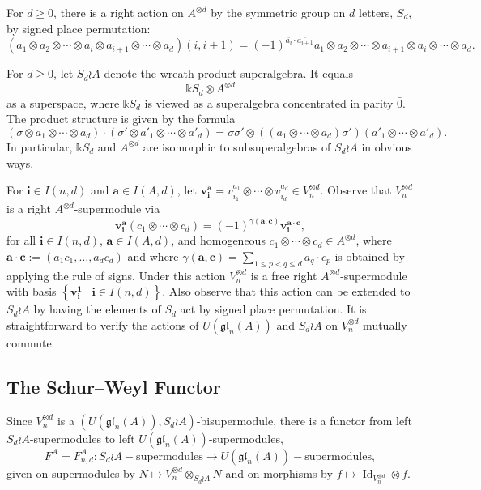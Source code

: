 \documentclass[11pt,reqno]{amsart} %
\newcommand{\gl}{\mathfrak{gl}}
\renewcommand{\k}{\mathds{k}}
\newcommand{\0}{\bar{0}}
\newcommand{\1}{\bar{1}}
\newcommand{\parity}[1]{\overline{#1}}
\newcommand{\Id}{\operatorname{Id}}
\newcommand{\wreath}{\wr}
\newcommand{\bv}{\mathbf{v}}
\newcommand{\SdwreathA}{S_{d} \wreath A}
\newcommand{\bi}{\mathbf{i}}
\newcommand{\ba}{\mathbf{a}}
\newcommand{\bc}{\mathbf{c}}
\newcommand{\bone}{\mathbf{1}}
\numberwithin{equation}{subsection}
\begin{document}
For $d \geq 0$, there is a right action on $A^{\otimes d}$ by the symmetric group on $d$ letters, $S_{d}$, by signed place permutation:
\[
(a_{1} \otimes a_{2} \otimes \dotsb \otimes a_{i} \otimes a_{i+1} \otimes \dotsb \otimes a_{d}) (i,i+1) = (-1)^{\parity{a_{i}}\cdot\parity{a_{i+1}}} a_{1} \otimes a_{2} \otimes \dotsb \otimes a_{i+1} \otimes a_{i} \otimes \dotsb \otimes a_{d}.
\]  


For $d \geq 0$, let $S_{d} \wreath A$ denote the wreath product superalgebra.  It equals 
\[
\k S_{d} \otimes  A^{\otimes d} 
\] as a superspace, where $\k S_{d}$ is viewed as a superalgebra concentrated in parity $\0$.  The product structure is given by the formula 
\[
\left( \sigma \otimes a_{1} \otimes \dotsb \otimes  a_{d} \right)  \cdot \left(\sigma' \otimes a'_{1} \otimes \dotsb \otimes  a'_{d} \right) =  \sigma\sigma' \otimes \left((a_{1} \otimes \dotsb \otimes  a_{d})\sigma' \right) \left(a'_{1} \otimes \dotsb \otimes a'_{d} \right).
\]  In particular, $\k S_{d}$ and $A^{\otimes d}$ are isomorphic to subsuperalgebras of $\SdwreathA$ in obvious ways.




For $\bi \in I(n,d)$ and $\ba \in I(A,d)$, let $\bv_{\bi}^{\ba} = v_{i_{1}}^{a_{1}} \otimes \dotsb \otimes v_{i_{d}}^{a_{d}} \in V_{n}^{\otimes d}$.  Observe that  $V_{n}^{\otimes d}$ is a right $A^{\otimes d}$-supermodule via 
\[
\bv_{\bi}^{\ba} \left( c_{1}\otimes \dotsb \otimes c_{d}\right) = (-1)^{\gamma(\ba, \bc)}\bv_{\bi}^{\ba \cdot \bc},
\] for all $\bi \in I(n,d)$, $\ba \in I(A,d)$, and homogeneous $c_{1} \otimes \dotsb \otimes  c_{d} \in A^{\otimes d}$, where $\ba \cdot \bc := (a_{1}c_{1}, \dotsc , a_{d}c_{d})$ and where $\gamma(\ba, \bc) = \sum_{1 \leq p < q \leq d} \parity{a_{q}}\cdot\parity{c_{p}}$ is obtained by applying the rule of signs.  Under this action $V_{n}^{\otimes d}$ is a free right $A^{\otimes d}$-supermodule with basis $\left\{\bv^{\bone}_{\bi} \mid \bi \in I(n,d) \right\}$.  Also observe that this action can be extended to $S_{d} \wreath A$ by having the elements of $S_{d}$ act by signed place permutation.  It is straightforward to verify the actions of $U(\gl_{n}(A))$ and $\SdwreathA$ on $V_{n}^{\otimes d}$ mutually commute.



\subsection{The Schur--Weyl  Functor}   Since $V_{n}^{\otimes  d}$ is a $(U(\gl_{n}(A)), S_{d}\wreath A)$-bisupermodule,  there is a functor from left $S_{d}\wreath A$-supermodules to left $U(\gl_{n}(A))$-supermodules,
\[
F^{A}=F_{n,d}^{A}: S_{d} \wreath A-\text{supermodules} \to U(\gl_{n}(A))-\text{supermodules},
\] given on supermodules by $N \mapsto V_{n}^{\otimes d} \otimes_{S_{d}\wreath A} N$ and on morphisms by $f \mapsto \Id_{V_{n}^{\otimes d}} \otimes f$.
\end{document}
